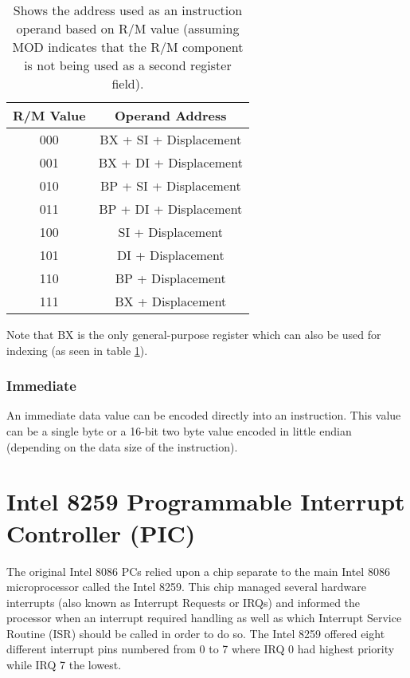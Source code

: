         \begin{table}[h]
            \centering
            \begin{tabular} { | c | c | }
                \hline
                R/M Value & Operand Address \\
                \hline
                000 & BX + SI + Displacement \\
                001 & BX + DI + Displacement \\
                010 & BP + SI + Displacement \\
                011 & BP + DI + Displacement \\
                100 & SI + Displacement \\
                101 & DI + Displacement \\
                110 & BP + Displacement \\
                111 & BX + Displacement \\
                \hline
            \end{tabular}
            \caption{Shows the address used as an instruction operand based on R/M value (assuming MOD indicates that the R/M component is not being used as a second register field).}
            \label{table:rm-values}
        \end{table}

        Note that BX is the only general-purpose register which can also be used for indexing (as seen in table \ref{table:rm-values}).

    \subsubsection{Immediate}
        An immediate data value can be encoded directly into an instruction. This value can be a single byte or a 16-bit two byte value encoded in little endian (depending on the data size of the instruction).

\section{Intel 8259 Programmable Interrupt Controller (PIC)}
    The original Intel 8086 PCs relied upon a chip separate to the main Intel 8086 microprocessor called the Intel 8259. This chip managed several hardware interrupts (also known as Interrupt Requests or IRQs) and informed the processor when an interrupt required handling as well as which Interrupt Service Routine (ISR) should be called in order to do so. The Intel 8259 offered eight different interrupt pins numbered from 0 to 7 where IRQ 0 had highest priority while IRQ 7 the lowest.

